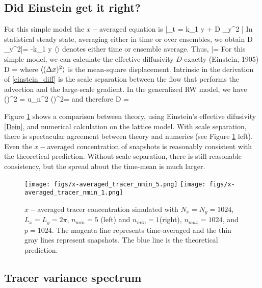 \documentclass[11pt]{article}
\newcommand{\bvth}{\bar{\vth}}
\begin{document}
\subsection{Did Einstein get it right?}
For this simple model the $x-$averaged equation is
\beq
\label{xave_cos}
\bvth_t   = \cos k_1 y + D \p_y^2 \bvth\com
\eeq
In statistical steady state, averaging either in time or over ensembles, we obtain
\beq
D \p_y^2\langle \bvth\rangle = -\cos k_1 y\com
\eeq
$\langle\rangle$ denotes either time or ensemble average. Thus,
\beq
\langle \bvth \rangle = \per
\eeq
For this simple model, we can calculate the effective diffusivity $D$ exactly (Einstein, 1905)
\beq
\label{einstein_diff}
D = \frac{\langle (\dx)^2 \rangle}{2 \dt}\com
\eeq
where $\langle (\Delta x)^2 \rangle$ is the mean-square displacement. Intrinsic in the derivation of
\eqref{einstein_diff} is the scale separation between the flow that performs the  advection
and the large-scale gradient. In the generalized RW model, we have
\beq
\langle (\dx)^2 \rangle = \langle u_n^2 (\dt)^2\rangle = \com
\eeq
and therefore
\beq
\label{Dein}
D = \per
\eeq

Figure \ref{p35} shows a comparison between theory, using Einstein's effective difusivity
\eqref{Dein}, and numerical calculation on the lattice model. With scale separation, there
is spectacular agreement between theory and numerics (see Figure \ref{p35} left). Even
the $x-$averaged concentration of snapshots is reasonably consistent with the theoretical prediction.
Without scale separation, there is still reasonable consistency, but the spread about the time-mean
is much larger.

\begin{figure}[ht]
    \label{p35}
    \centering
    \texttt{[image: figs/x-averaged\_tracer\_nmin\_5.png]}
    \texttt{[image: figs/x-averaged\_tracer\_nmin\_1.png]}
    \caption{$x-$averaged tracer concentration simulated with $N_x = N_y = 1024$, $L_x = L_y = 2 \pi$, 
        $n_{min}=5$ (left) and $n_{min}=1$(right), $n_{max}=1024$, and $p=1024$. The magenta line represents time-averaged 
            and the thin gray lines represent snapshots. The blue line is the theoretical prediction.}
\end{figure}

\subsection{Tracer variance spectrum}
\end{document}
